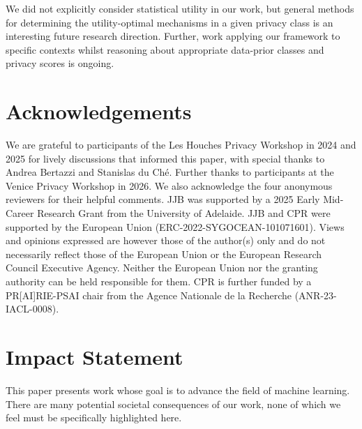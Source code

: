 \documentclass{article}
\theoremstyle{plain}
\theoremstyle{plain}
\theoremstyle{definition}
\theoremstyle{remark}
\theoremstyle{plain}
\begin{document}
We did not explicitly consider statistical utility in our work, but general methods for determining the utility-optimal mechanisms in a given privacy class is an interesting future research direction. Further, work applying our framework to specific contexts whilst reasoning about appropriate data-prior classes and privacy scores is ongoing.


\section*{Acknowledgements}
We are grateful to participants of the Les Houches Privacy Workshop in 2024 and 2025 for lively discussions that informed this paper, with special thanks to Andrea Bertazzi and Stanislas du Ch\'{e}. Further thanks to participants at the Venice Privacy Workshop in 2026. We also acknowledge the four anonymous reviewers for their helpful comments. JJB was supported by a 2025 Early Mid-Career Research Grant from the University of Adelaide. JJB and CPR were supported by the European Union (ERC-2022-SYGOCEAN-101071601). Views and opinions expressed are however those of the author(s) only and do not necessarily reflect those of the European Union or the European Research Council Executive Agency. Neither the European Union nor the granting authority can be held responsible for them. CPR is further funded by a PR[AI]RIE-PSAI chair from the Agence Nationale de la Recherche (ANR-23-IACL-0008).

\section*{Impact Statement}

This paper presents work whose goal is to advance the field of machine learning. There are many potential societal consequences of our work, none of which we feel must be specifically highlighted here.


\def\UrlBreaks{\do\/\do-\do_}%



\newpage
\appendix
\onecolumn
\end{document}
